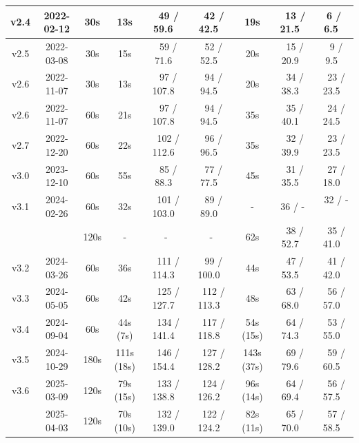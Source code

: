 \documentclass[a4paper]{llncs}
\begin{document}
\begin{table}[t]
\begin{tabular}{|c|c|c|c|c|c|c|c|c|}
    \hline
    v2.4 & 2022-02-12 & 30s & 13s & ~49 / 59.6~ & ~42 / 42.5~ & 19s & ~13 / 21.5~ & 6 / 6.5~ \\ %
    \hline
    v2.5 & 2022-03-08 & 30s & 15s & ~59 / 71.6~ & ~52 / 52.5~ & 20s & ~15 / 20.9~ & ~9 / 9.5~ \\
    \hline
    v2.6 & 2022-11-07 & 30s & 13s & ~97 / 107.8~ & ~94 / 94.5~ & 20s & ~34 / 38.3~ & ~23 / 23.5~ \\
    v2.6 & 2022-11-07 & 60s & 21s & ~97 / 107.8~ & ~94 / 94.5~ &  35s & ~35 / 40.1~ & ~24 / 24.5~ \\
    \hline
    v2.7 & 2022-12-20 & 60s & 22s & ~102 / 112.6~ & ~96 / 96.5~ & 35s & ~32 / 39.9~ & ~23 / 23.5~ \\
    \hline
    \hline
    v3.0 & 2023-12-10 & 60s & 55s & ~85 / 88.3~ & ~77 / 77.5~ & 45s & ~31 / 35.5~ & ~27 / 18.0~ \\
    \hline
    v3.1 & 2024-02-26 & 60s & 32s & ~101 / 103.0~ & ~89 / 89.0~ & - & ~36 / -~ & ~32 / -~ \\
         &            & 120s & - & - & - & 62s & ~38 / 52.7~ & ~35 / 41.0~ \\
    \hline
    v3.2 & 2024-03-26 & 60s & 36s & ~111 / 114.3~ & ~99 / 100.0~ & 44s & ~47 / 53.5~ & ~41 / 42.0~ \\
    \hline
    v3.3 & 2024-05-05 & 60s & 42s & ~125 / 127.7~ & ~112 / 113.3~ & 48s & ~63 / 68.0~ & ~56 / 57.0~ \\
    \hline
    v3.4 & 2024-09-04 & 60s & 44s (7s) & ~134 / 141.4~ & ~117 / 118.8~ & 54s (15s) & ~64 / 74.3~ & ~53 / 55.0~ \\
    \hline
    v3.5 & 2024-10-29 & 180s & 111s (18s) & ~146 / 154.4~ & ~127 / 128.2~ & 143s (37s) & ~69 / 79.6~ & ~59 / 60.5~ \\
    \hline
    v3.6 & 2025-03-09 & 120s & 79s (15s) & ~133 / 138.8~ & ~124 / 126.2~ & 96s (14s) & ~64 / 69.4~ & ~56 / 57.5~ \\
    \hline
     & 2025-04-03 & 120s & 70s (10s) & ~132 / 139.0~ & ~122 / 124.2~ & 82s (11s) & ~65 / 70.0~ & ~57 / 58.5~ \\

\end{tabular}
\end{table}
\end{document}
